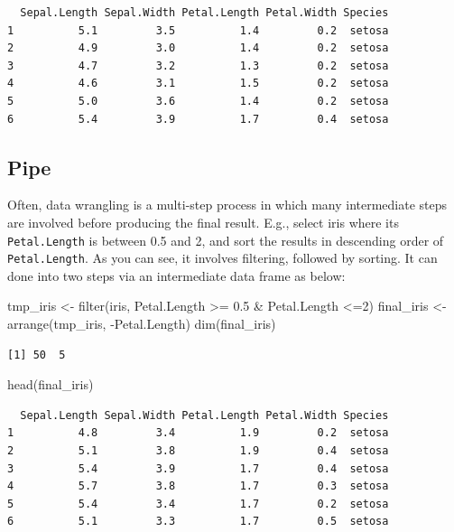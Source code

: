 \documentclass[
  letterpaper,
]{book}
\newenvironment{Shaded}{\begin{snugshade}}{\end{snugshade}}
\newcommand{\DecValTok}[1]{\textcolor[rgb]{0.68,0.00,0.00}{#1}}
\newcommand{\FloatTok}[1]{\textcolor[rgb]{0.68,0.00,0.00}{#1}}
\newcommand{\FunctionTok}[1]{\textcolor[rgb]{0.28,0.35,0.67}{#1}}
\newcommand{\NormalTok}[1]{\textcolor[rgb]{0.00,0.23,0.31}{#1}}
\newcommand{\OtherTok}[1]{\textcolor[rgb]{0.00,0.23,0.31}{#1}}
\newcommand{\SpecialCharTok}[1]{\textcolor[rgb]{0.37,0.37,0.37}{#1}}
\begin{document}
\begin{verbatim}
  Sepal.Length Sepal.Width Petal.Length Petal.Width Species
1          5.1         3.5          1.4         0.2  setosa
2          4.9         3.0          1.4         0.2  setosa
3          4.7         3.2          1.3         0.2  setosa
4          4.6         3.1          1.5         0.2  setosa
5          5.0         3.6          1.4         0.2  setosa
6          5.4         3.9          1.7         0.4  setosa
\end{verbatim}

\subsection{Pipe}\label{pipe}

Often, data wrangling is a multi-step process in which many intermediate
steps are involved before producing the final result. E.g., select iris
where its \texttt{Petal.Length} is between 0.5 and 2, and sort the
results in descending order of \texttt{Petal.Length}. As you can see, it
involves filtering, followed by sorting. It can done into two steps via
an intermediate data frame as below:

\begin{Shaded}
\begin{Highlighting}[]
\NormalTok{tmp\_iris }\OtherTok{\textless{}{-}} \FunctionTok{filter}\NormalTok{(iris, Petal.Length }\SpecialCharTok{\textgreater{}=} \FloatTok{0.5} \SpecialCharTok{\&}\NormalTok{ Petal.Length }\SpecialCharTok{\textless{}=}\DecValTok{2}\NormalTok{)}
\NormalTok{final\_iris }\OtherTok{\textless{}{-}} \FunctionTok{arrange}\NormalTok{(tmp\_iris, }\SpecialCharTok{{-}}\NormalTok{Petal.Length)}
\FunctionTok{dim}\NormalTok{(final\_iris)}
\end{Highlighting}
\end{Shaded}

\begin{verbatim}
[1] 50  5
\end{verbatim}

\begin{Shaded}
\begin{Highlighting}[]
\FunctionTok{head}\NormalTok{(final\_iris)}
\end{Highlighting}
\end{Shaded}

\begin{verbatim}
  Sepal.Length Sepal.Width Petal.Length Petal.Width Species
1          4.8         3.4          1.9         0.2  setosa
2          5.1         3.8          1.9         0.4  setosa
3          5.4         3.9          1.7         0.4  setosa
4          5.7         3.8          1.7         0.3  setosa
5          5.4         3.4          1.7         0.2  setosa
6          5.1         3.3          1.7         0.5  setosa
\end{verbatim}
\end{document}
